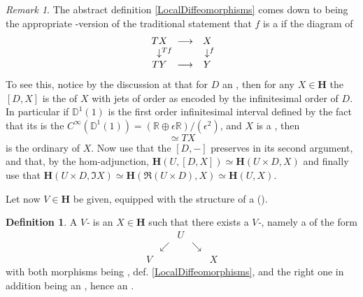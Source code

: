 \documentclass[12pt,titlepage]{article}
\def\mathrlap{\mathpalette\mathrlapinternal}
\def\mathrlapinternal#1#2{\rlap{$\mathsurround=0pt#1{#2}$}}
\newcommand{\itexarray}[1]{\begin{matrix}#1\end{matrix}}
\theoremstyle{plain}
\theoremstyle{definition}
\newtheorem{defn}{Definition}
\theoremstyle{remark}
\newtheorem{remark}{Remark}
\begin{document}
\begin{remark}
\label{}\hypertarget{}{}
The abstract definition \ref{LocalDiffeomorphisms} comes down to being the appropriate -version of the traditional statement that $f$ is a  if the diagram of 
\begin{displaymath}
\itexarray{
T X &\longrightarrow& X
\\
\downarrow^{\mathrlap{T f}} && \downarrow^{\mathrlap{f}}
\\
T Y &\longrightarrow& Y
}
\end{displaymath}
To see this, notice by the discussion at  that for $D$ an , then for any $X \in \mathbf{H}$ the  $[D,X]$ is the  of $X$ with jets of order as encoded by the infinitesimal order of $D$. In particular if $\mathbb{D}^1(1)$ is the first order infinitesimal interval defined by the fact that its  is the  $C^\infty(\mathbb{D}^1(1)) = (\mathbb{R} \oplus \epsilon \mathbb{R})/(\epsilon^2)$, and $X$ is a , then
\begin{displaymath}
[\mathbb{D}^1(1), X]\simeq T X
\end{displaymath}
is the ordinary  of $X$. Now use that the  $[D,-]$ preserves  in its second argument, and that, by the hom-adjunction, $\mathbf{H}(U, [D,X]) \simeq \mathbf{H}(U \times D, X)$ and finally use that $\mathbf{H}(U \times D, \Im X)\simeq \mathbf{H}(\Re(U \times D), X)\simeq \mathbf{H}(U,X)$.
\end{remark}
Let now $V \in \mathbf{H}$ be given, equipped with the structure of a  ().
\begin{defn}
\label{VManifold}\hypertarget{VManifold}{}
A \emph{$V$-} is an $X \in \mathbf{H}$ such that there exists a \emph{$V$-}, namely a  of the form
\begin{displaymath}
\itexarray{
&& U
\\
& \swarrow && \searrow
\\
V && && X
}
\end{displaymath}
with both morphisms being , def. \ref{LocalDiffeomorphisms}, and the right one in addition being an , hence an .
\end{defn}
\end{document}
